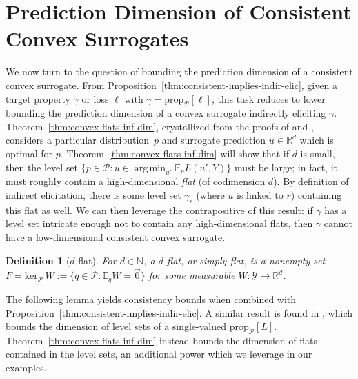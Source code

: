\documentclass[11pt]{article} %
\newcommand{\Comments}{1}
\newcommand{\mytodo}[2]{\ifnum\Comments=1%
	\todo[linecolor=#1!80!black,backgroundcolor=#1,bordercolor=#1!80!black]{#2}\fi}
\newcommand{\raft}[1]{\mytodo{green!20!white}{RF: #1}}
\newcommand{\jessiet}[1]{\mytodo{purple!20!white}{JF: #1}}
\newcommand{\reals}{\mathbb{R}}
\newcommand{\simplex}{\Delta_\Y}
\newcommand{\prop}[2][\mathcal{P}]{\mathrm{prop}_{#1}[#2]}
\newcommand{\spn}{\mathrm{span}}
\newcommand{\zeros}[1]{\mathrm{ker}_\P\,#1}
\newcommand{\affhull}{\mathrm{affhull}}
\newcommand{\E}{\mathbb{E}}
\renewcommand{\P}{\mathcal{P}}
\newcommand{\Y}{\mathcal{Y}}
\newcommand{\exploss}[3]{\E_{#3} #1(#2,Y)}
\newtheorem{definition}{Definition}
\DeclareMathOperator*{\argmin}{arg\,min}
\begin{document}
\section{Prediction Dimension of Consistent Convex Surrogates}\label{sec:char-convex}
We now turn to the question of bounding the prediction dimension of a consistent convex surrogate.
From Proposition~\ref{thm:consistent-implies-indir-elic}, given a target property $\gamma$ or loss $\ell$ with $\gamma = \prop{\ell}$, this task reduces to lower bounding the prediction dimension of a convex surrogate indirectly eliciting $\gamma$.
Theorem~\ref{thm:convex-flats-inf-dim}, crystallized from the proofs of \citet[Theorem 16]{ramaswamy2016convex} and \citet[Theorem 9]{agarwal2015consistent}, considers a particular distribution~$p$ and surrogate prediction $u \in \reals^d$ which is optimal for $p$.
Theorem~\ref{thm:convex-flats-inf-dim} will show that if $d$ is small, then the level set $\{p \in \P : u \in \argmin_{u'} \exploss{L}{u'}{p}\}$ must be large; in fact, it must roughly contain a high-dimensional \emph{flat} (of codimension $d$).
By definition of indirect elicitation, there is some level set $\gamma_r$ (where $u$ is linked to $r$) containing this flat as well.
We can then leverage the contrapositive of this result: if $\gamma$ has a level set intricate enough not to contain any high-dimensional flats, then $\gamma$ cannot have a low-dimensional consistent convex surrogate.


\begin{definition}[$d$-flat]\label{def:flat-general}
  For $d\in\mathbb N$, a \emph{$d$-flat}, or simply \emph{flat}, is a nonempty set $F = \zeros{W} := \{q \in \P : \E_q W = \vec 0\}$ for some measurable $W:\Y \to \reals^d$.
\end{definition}

The following lemma yields consistency bounds when combined with Proposition~\ref{thm:consistent-implies-indir-elic}. %
A similar result is found in \citet[Theorem 9]{agarwal2015consistent}, which bounds the dimension of level sets of a single-valued $\prop{L}$.
Theorem~\ref{thm:convex-flats-inf-dim} instead bounds the dimension of flats contained in the level sets, an additional power which we leverage in our examples.
\end{document}

